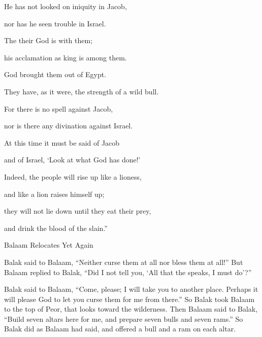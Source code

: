 {\par }{\Q {}He has not
looked on
iniquity
in Jacob,
\par }{\Q nor
has he seen
trouble
in Israel.
\par }{\Q The
{}
their God
is with
them;
\par }{\Q his acclamation
as king is among them.
\par }{\Q {}God
brought them out
of Egypt.
\par }{\Q They have, as it were, the strength
of a wild bull.
\par }{\Q {}For
there is no
spell
against Jacob,
\par }{\Q nor
is there any divination
against Israel.
\par }{\Q At this time
it must be said
of Jacob
\par }{\Q and of Israel,
‘Look at what
God
has done!’
\par }{\Q {}Indeed,
the people
will rise
up like a lioness,
\par }{\Q and like a lion
raises
himself up;
\par }{\Q they
will not
lie
down until
they eat
their prey,
\par }{\Q and drink
the blood
of the slain.”
\par }{\SH Balaam Relocates Yet Again
\par }{\PP {}Balak
said
to Balaam,
“Neither
curse
them at all nor
bless them at all!”
But
Balaam
replied
to
Balak,
“Did I not
tell
you, ‘All
that
the {}
speaks,
I must do’?”
\par }{\PP {}Balak
said
to
Balaam,
“Come,
please;
I will take
you to
another
place.
Perhaps
it will please
God
to let you curse
them for me from there.”
So
Balak
took
Balaam
to the top
of Peor,
that looks
toward
the wilderness.
Then Balaam
said to
Balak,
“Build
seven
altars
here for me, and prepare
seven
bulls
and seven
rams.”
So Balak
did
as
Balaam
had
said,
and offered
a bull
and a ram
on each altar.


\par }
